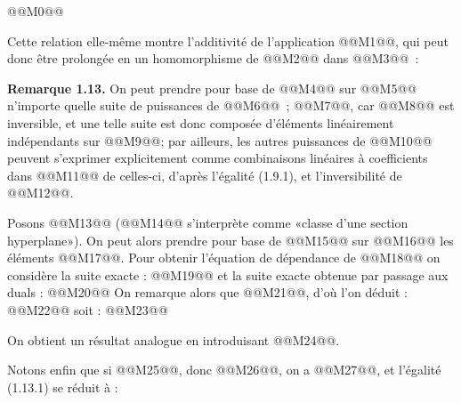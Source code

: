 
@@M0@@

Cette relation elle-même montre l'additivité de l'application @@M1@@, qui peut donc être prolongée en un homomorphisme de @@M2@@ dans @@M3@@~:

\textbf{Remarque 1.13.} On peut prendre pour base de @@M4@@ sur @@M5@@ n'importe quelle suite de puissances de @@M6@@~; @@M7@@, car @@M8@@ est inversible, et une telle suite est donc composée d'éléments linéairement indépendants sur @@M9@@; par ailleurs, les autres puissances de @@M10@@ peuvent s'exprimer explicitement comme combinaisons linéaires à coefficients dans @@M11@@ de celles-ci, d'après l'égalité (1.9.1), et l'inversibilité de @@M12@@.

Posons @@M13@@ (@@M14@@ s'interprète comme «classe d'une section hyperplane»). On peut alors prendre pour base de @@M15@@ sur @@M16@@ les éléments @@M17@@. Pour obtenir l'équation de dépendance de @@M18@@ on considère la suite exacte :
@@M19@@
et la suite exacte obtenue par passage aux duals :
@@M20@@
On remarque alors que @@M21@@, d'où l'on déduit :
@@M22@@
soit :
@@M23@@

On obtient un résultat analogue en introduisant @@M24@@.

Notons enfin que si @@M25@@, donc @@M26@@, on a @@M27@@, et l'égalité (1.13.1) se réduit à :
